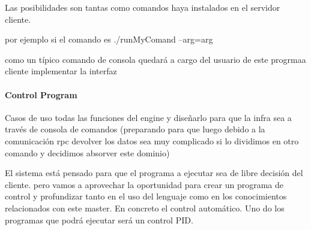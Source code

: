 Las posibilidades son tantas como comandos haya instalados en el servidor cliente.

por ejemplo si el comando es ./runMyComand --arg=arg

como un típico comando de consola quedará a cargo del usuario de este progrmaa cliente implementar la interfaz

\paragraph{Control Program}

Casos de uso todas las funciones del engine y diseñarlo para que la infra sea a través de consola de comandos (preparando para que luego debido a la comunicación rpc devolver los datos sea muy complicado si lo dividimos en otro comando y decidimos absorver este dominio)

El sistema está pensado para que el programa a ejecutar sea de libre decisión del cliente. pero vamos a aprovechar la oportunidad para crear un programa de control y profundizar tanto en el uso del lenguaje como en los conocimientos relacionados con este master. En concreto el control automático. Uno do los programas que podrá ejecutar será un control PID.